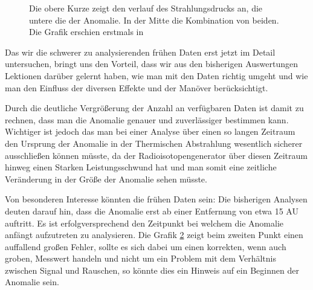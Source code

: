 \begin{figure}[htnb]
\begin{center}
\noindent    
{}
\end{center}
\vskip -10pt
  \caption{
Die obere Kurze zeigt den verlauf des Strahlungsdrucks an, die untere die der Anomalie. In der Mitte die Kombination von beiden. Die Grafik erschien erstmals in \cite{Anderson1992}}
\label{fig:forces}
\end{figure} 

\begin{figure}[htnb]
\begin{center}
\noindent    
{}
\end{center}
\vskip -10pt
  \caption{
}
\label{fig:anomalie}
\end{figure} 

Das wir die schwerer zu analysierenden frühen Daten erst jetzt im Detail untersuchen, bringt uns den Vorteil, dass wir aus den bisherigen Auswertungen Lektionen darüber gelernt haben, wie man mit den Daten richtig umgeht und wie man den Einfluss der diversen Effekte und der Manöver berücksichtigt.\cite{Nieto2005}

Durch die deutliche Vergrößerung der Anzahl an verfügbaren Daten ist damit zu rechnen, dass man die Anomalie genauer und zuverlässiger bestimmen kann. Wichtiger ist jedoch das man bei einer Analyse über einen so langen Zeitraum den Ursprung der Anomalie in der Thermischen Abstrahlung wesentlich sicherer ausschließen können müsste, da der Radioisotopengenerator über diesen Zeitraum hinweg einen Starken Leistungsschwund hat und man somit eine zeitliche Veränderung in der Größe der Anomalie sehen müsste.

Von besonderen Interesse könnten die frühen Daten sein:
Die bisherigen Analysen deuten darauf hin, dass die Anomalie erst ab einer Entfernung von etwa 15 AU auftritt. Es ist erfolgversprechend den Zeitpunkt bei welchem die Anomalie anfängt aufzutreten zu analysieren. Die Grafik \ref{fig:anomalie} zeigt beim zweiten Punkt einen auffallend großen Fehler, sollte es sich dabei um einen korrekten, wenn auch groben, Messwert handeln und nicht um ein Problem  mit dem Verhältnis zwischen Signal und Rauschen, so könnte dies ein Hinweis auf ein Beginnen der Anomalie sein.\cite{Nieto2005} %


